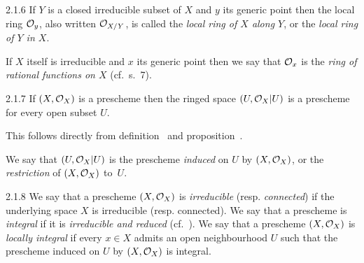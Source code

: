 \begin{env}{2.1.6}
\label{env-1.2.1.6}
If $Y$ is a closed irreducible subset of $X$ and $y$ its
generic point then the local ring $\mathcal{O}_y$, also written $\mathcal{O}_{X/Y}$, is called the
\emph{local ring of $X$ along $Y$}, or the \emph{local ring of $Y$ in $X$}.

If $X$ itself is irreducible and $x$ its generic point then we say that
$\mathcal{O}_x$ is the \emph{ring of rational functions on $X$} (cf.~s.~7).
\end{env}

\begin{env}[Proposition]{2.1.7}
\label{prop-1.2.1.7}
If $(X,\mathcal{O}_X)$ is a prescheme then the ringed
space $(U,\mathcal{O}_X|U)$ is a prescheme for every open subset $U$.
\end{env}

This follows directly from definition~ and
proposition~.

We say that $(U,\mathcal{O}_X|U)$ is the prescheme \emph{induced} on $U$ by
$(X,\mathcal{O}_X)$, or the \emph{restriction} of $(X,\mathcal{O}_X)$ to~$U$.

\begin{env}{2.1.8}
\label{env-1.2.1.8}
We say that a prescheme $(X,\mathcal{O}_X)$ is \emph{irreducible}
(resp. \emph{connected}) if the underlying space $X$ is irreducible (resp.
connected).  We say that a prescheme is \emph{integral} if it is
\emph{irreducible and reduced} (cf.~).  We say that a prescheme
$(X,\mathcal{O}_X)$ is \emph{locally integral} if every $x\in X$ admits an open
neighbourhood $U$ such that the prescheme induced on $U$ by $(X,\mathcal{O}_X)$ is
integral.
\end{env}

